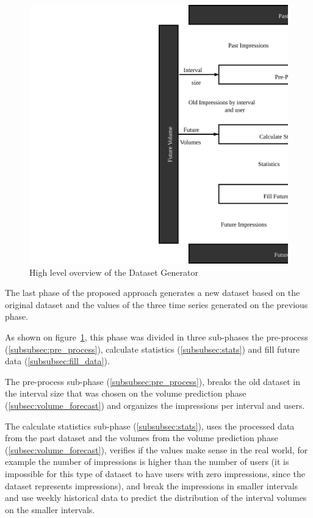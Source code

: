 \begin{figure}[h] \begin{center} \leavevmode
\includegraphics[]{high_level_file_gen} \caption{ High level overview
of the Dataset Generator } \label{fig:highlevel_arch_file_gen} \end{center} \end{figure}

The last phase of the proposed approach generates a new dataset based on the
original dataset and the values of the three time series generated on the
previous phase.

As shown on figure~\ref{fig:highlevel_arch_file_gen}, this phase was divided in
three sub-phases the pre-process (\ref{subsubsec:pre_process}), calculate
statistics (\ref{subsubsec:stats}) and fill future data
(\ref{subsubsec:fill_data}).

The pre-process sub-phase (\ref{subsubsec:pre_process}), breaks the old dataset in
the interval size that was chosen on the volume prediction phase
(\ref{subsec:volume_forecast}) and organizes the impressions per interval and
users.

The calculate statistics sub-phase (\ref{subsubsec:stats}), uses the processed data
from the past dataset and the volumes from the volume prediction phase
(\ref{subsec:volume_forecast}), verifies if the values make sense in the real
world, for example the number of impressions is higher than the number of users
(it is impossible for this type of dataset to have users with zero impressions,
since the dataset represents impressions), and break the impressions in smaller
intervals and use weekly historical data to predict the distribution of the
interval volumes on the smaller intervals.

